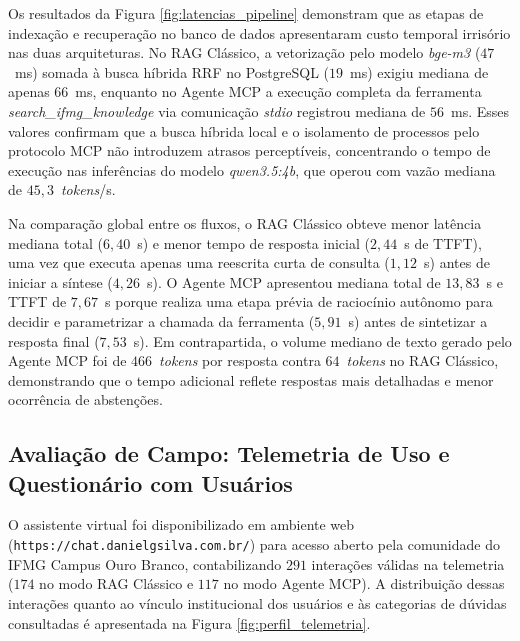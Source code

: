 \documentclass[12pt]{article}
\begin{document}
Os resultados da Figura \ref{fig:latencias_pipeline} demonstram que as etapas de indexação e recuperação no banco de dados apresentaram custo temporal irrisório nas duas arquiteturas. No RAG Clássico, a vetorização pelo modelo \textit{bge-m3} ($47$~ms) somada à busca híbrida RRF no PostgreSQL ($19$~ms) exigiu mediana de apenas $66$~ms, enquanto no Agente MCP a execução completa da ferramenta \textit{search\_ifmg\_knowledge} via comunicação \textit{stdio} registrou mediana de $56$~ms. Esses valores confirmam que a busca híbrida local e o isolamento de processos pelo protocolo MCP não introduzem atrasos perceptíveis, concentrando o tempo de execução nas inferências do modelo \textit{qwen3.5:4b}, que operou com vazão mediana de $45,3$~\textit{tokens}/s.

Na comparação global entre os fluxos, o RAG Clássico obteve menor latência mediana total ($6,40$~s) e menor tempo de resposta inicial ($2,44$~s de TTFT), uma vez que executa apenas uma reescrita curta de consulta ($1,12$~s) antes de iniciar a síntese ($4,26$~s). O Agente MCP apresentou mediana total de $13,83$~s e TTFT de $7,67$~s porque realiza uma etapa prévia de raciocínio autônomo para decidir e parametrizar a chamada da ferramenta ($5,91$~s) antes de sintetizar a resposta final ($7,53$~s). Em contrapartida, o volume mediano de texto gerado pelo Agente MCP foi de $466$~\textit{tokens} por resposta contra $64$~\textit{tokens} no RAG Clássico, demonstrando que o tempo adicional reflete respostas mais detalhadas e menor ocorrência de abstenções.

\FloatBarrier

\subsection{Avaliação de Campo: Telemetria de Uso e Questionário com Usuários}

O assistente virtual foi disponibilizado em ambiente web (\texttt{https://chat.danielgsilva.com.br/}) para acesso aberto pela comunidade do IFMG Campus Ouro Branco, contabilizando $291$ interações válidas na telemetria ($174$ no modo RAG Clássico e $117$ no modo Agente MCP). A distribuição dessas interações quanto ao vínculo institucional dos usuários e às categorias de dúvidas consultadas é apresentada na Figura \ref{fig:perfil_telemetria}.
\end{document}
